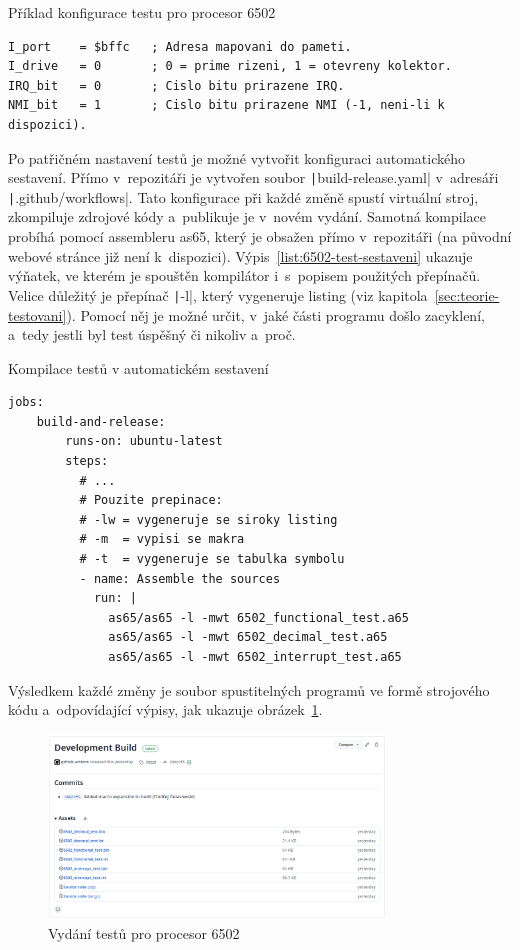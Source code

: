 \begin{listing}
	\caption{Příklad konfigurace testu pro procesor 6502}
	\label{list:6502-test-konfigurace}
	\begin{verbatim}
I_port    = $bffc   ; Adresa mapovani do pameti.
I_drive   = 0       ; 0 = prime rizeni, 1 = otevreny kolektor.
IRQ_bit   = 0       ; Cislo bitu prirazene IRQ.
NMI_bit   = 1       ; Cislo bitu prirazene NMI (-1, neni-li k dispozici).
	\end{verbatim}
\end{listing}

Po patřičném nastavení testů je možné vytvořit konfiguraci automatického sestavení. Přímo v~repozitáři je vytvořen soubor \texttt|build-release.yaml| v~adresáři \texttt|.github/workflows|. Tato konfigurace při každé změně spustí virtuální stroj, zkompiluje zdrojové kódy a~publikuje je v~novém vydání. Samotná kompilace probíhá pomocí assembleru as65, který je obsažen přímo v~repozitáři (na původní webové stránce již není k~dispozici). Výpis~\ref{list:6502-test-sestaveni} ukazuje výňatek, ve kterém je spouštěn kompilátor i~s~popisem použitých přepínačů. Velice důležitý je přepínač \texttt|-l|, který vygeneruje listing (viz kapitola~\ref{sec:teorie-testovani}). Pomocí něj je možné určit, v~jaké části programu došlo zacyklení, a~tedy jestli byl test úspěšný či nikoliv a~proč.

\begin{listing}
	\caption{Kompilace testů v automatickém sestavení}
	\label{list:6502-test-sestaveni}
	\begin{verbatim}
jobs:
    build-and-release:
        runs-on: ubuntu-latest
        steps:
          # ...
          # Pouzite prepinace:
          # -lw = vygeneruje se siroky listing
          # -m  = vypisi se makra
          # -t  = vygeneruje se tabulka symbolu
          - name: Assemble the sources
            run: |
              as65/as65 -l -mwt 6502_functional_test.a65
              as65/as65 -l -mwt 6502_decimal_test.a65
              as65/as65 -l -mwt 6502_interrupt_test.a65
	\end{verbatim}
\end{listing}

Výsledkem každé změny je soubor spustitelných programů ve formě strojového kódu a~odpovídající výpisy, jak ukazuje obrázek~\ref{fig:vydani-testu-6502}.

\begin{figure}[ht!]
	\centering
	\caption{Vydání testů pro procesor 6502}
	\label{fig:vydani-testu-6502}
    \includegraphics[width=0.8\textwidth]{images/vydani-testu-6502.png}
\end{figure}

